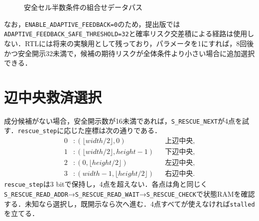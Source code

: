 \begin{figure}[tb]
  \centering
  \caption{安全セル半数条件の組合せデータパス}
  \label{fig:half-safe-datapath}
\end{figure}

なお，\texttt{ENABLE\_ADAPTIVE\_FEEDBACK=0}のため，提出版では\texttt{ADAPTIVE\_FEEDBACK\_SAFE\_THRESHOLD=32}と確率リスク交差積による経路は使用しない．RTLには将来の実験用として残っており，パラメータを1にすれば，8回後かつ安全開示32未満で，候補の期待リスクが全体条件より小さい場合に追加選択できる．

\section{辺中央救済選択}
\label{sec:edge-rescue}

成分候補がない場合，安全開示数が16未満であれば，\texttt{S\_RESCUE\_NEXT}が4点を試す．\texttt{rescue\_step}に応じた座標は次の通りである．
\begin{align*}
  0 &: (\lfloor width/2\rfloor,0) &&\text{上辺中央},\\
  1 &: (\lfloor width/2\rfloor,height-1) &&\text{下辺中央},\\
  2 &: (0,\lfloor height/2\rfloor) &&\text{左辺中央},\\
  3 &: (width-1,\lfloor height/2\rfloor) &&\text{右辺中央}.
\end{align*}
\texttt{rescue\_step}は3 bitで保持し，4点を超えない．各点は角と同じく\texttt{S\_RESCUE\_READ\_ADDR}→\texttt{S\_RESCUE\_READ\_WAIT}→\texttt{S\_RESCUE\_CHECK}で状態RAMを確認する．未知なら選択し，既開示なら次へ進む．4点すべてが使えなければ\texttt{stalled}を立てる．

